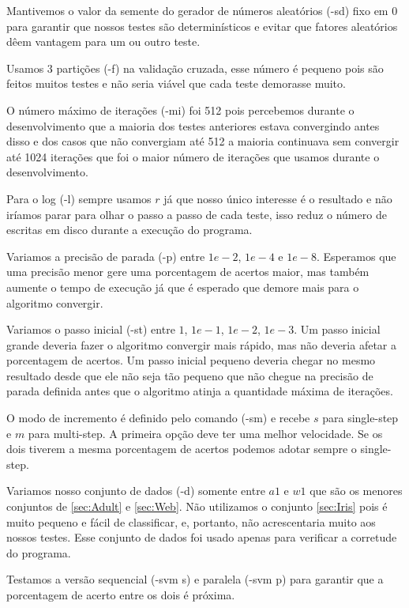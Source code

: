 Mantivemos o valor da semente do gerador de números aleatórios (-sd) fixo em $0$ para garantir que nossos testes são determinísticos e evitar que fatores aleatórios dêem vantagem para um ou outro teste.

Usamos $3$ partições (-f) na validação cruzada, esse número é pequeno pois são feitos muitos testes e não seria viável que cada teste demorasse muito.

O número máximo de iterações (-mi) foi 512 pois percebemos durante o desenvolvimento que a maioria dos testes anteriores estava convergindo antes disso e dos casos que não convergiam até 512 a maioria continuava sem convergir até 1024 iterações que foi o maior número de iterações que usamos durante o desenvolvimento.

Para o log (-l) sempre usamos $r$ já que nosso único interesse é o resultado e não iríamos parar para olhar o passo a passo de cada teste, isso reduz o número de escritas em disco durante a execução do programa. 

Variamos a precisão de parada (-p) entre $1e-2$, $1e-4$ e $1e-8$. Esperamos que uma precisão menor gere uma porcentagem de acertos maior, mas também aumente o tempo de execução já que é esperado que demore mais para o algoritmo convergir.

Variamos o passo inicial (-st) entre $1$, $1e-1$, $1e-2$, $1e-3$. Um passo inicial grande deveria fazer o algoritmo convergir mais rápido, mas não deveria afetar a porcentagem de acertos. Um passo inicial pequeno deveria chegar no mesmo resultado desde que ele não seja tão pequeno que não chegue na precisão de parada definida antes que o algoritmo atinja a quantidade máxima de iterações.

O modo de incremento é definido pelo comando (-sm) e recebe $s$ para single-step e $m$ para multi-step. A primeira opção deve ter uma melhor velocidade. Se os dois tiverem a mesma porcentagem de acertos podemos adotar sempre o single-step.

Variamos nosso conjunto de dados (-d) somente entre $a1$ e $w1$ que são os menores conjuntos de \ref{sec:Adult} e \ref{sec:Web}. Não utilizamos o conjunto \ref{sec:Iris} pois é muito pequeno e fácil de classificar, e, portanto, não acrescentaria muito aos nossos testes. Esse conjunto de dados foi usado apenas para verificar a corretude do programa.

Testamos a versão sequencial (-svm s) e paralela (-svm p) para garantir que a porcentagem de acerto entre os dois é próxima.

